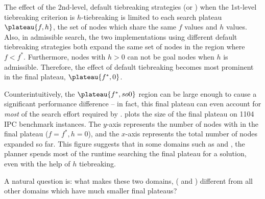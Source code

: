 

The effect of the 2nd-level, default tiebreaking strategies (\lifo or
\fifo)  when the 1st-level tiebreaking criterion is  $h$-tiebreaking is
limited to each search plateau $\plateau{f,h}$, the set of nodes which
share the same $f$ values and $h$ values.
% 
Also, in admissible search, the two \astar implementations using 
different default tiebreaking strategies both expand the same set of
nodes in the region where $f<f^*$.
% 
Furthermore, nodes with $h>0$ can not be goal nodes when $h$ is admissible.
% 
Therefore, the effect of default tiebreaking becomes most prominent in the final plateau, $\plateau{f^*,0}$.

Counterintuitively, the $\plateau{f^*,so 0}$ region can be large enough to
cause a significant performance difference -- in fact, this final plateau can even account for \emph{most} of the
search effort required by \astar.
 plots the size of the final plateau on 1104 IPC
benchmark instances.  The $y$-axis represents the number of nodes with
in the final plateau ($f=f^*, h=0$), and the $x$-axis represents the total
number of nodes expanded so far. This figure suggests that in some
domains such as  and , the planner
spends most of the runtime searching the final plateau for a solution,
even with the help of $h$ tiebreaking.

A natural question is:  what makes these two domains,
( and )  different from all other domains
which have much smaller final plateaus?

